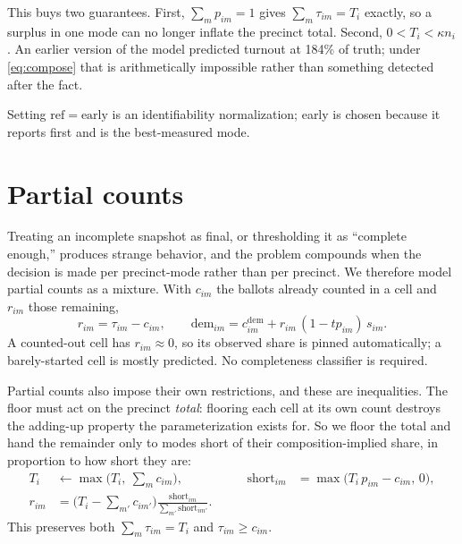 \documentclass[11pt]{article}
\newcommand{\dem}{\mathrm{dem}}
\newcommand{\refm}{\mathrm{ref}}
\begin{document}
This buys two guarantees. First, $\sum_m p_{im} = 1$ gives $\sum_m \tau_{im} = T_i$
exactly, so a surplus in one mode can no longer inflate the precinct total. Second,
$0 < T_i < \kappa n_i$. An earlier version of the model predicted turnout at 184\% of
truth; under \eqref{eq:compose} that is arithmetically impossible rather than something
detected after the fact.

Setting $\refm = \text{early}$ is an identifiability normalization; early is chosen
because it reports first and is the best-measured mode.

\section{Partial counts}

Treating an incomplete snapshot as final, or thresholding it as ``complete enough,''
produces strange behavior, and the problem compounds when the decision is made per
precinct-mode rather than per precinct. We therefore model partial counts as a mixture.
With $c_{im}$ the ballots already counted in a cell and $r_{im}$ those remaining,
\begin{equation}
  r_{im} = \tau_{im} - c_{im}, \qquad
  \dem_{im} = c^{\dem}_{im} + r_{im}\,(1 - tp_{im})\,s_{im}.
  \label{eq:mixture}
\end{equation}
A counted-out cell has $r_{im} \approx 0$, so its observed share is pinned automatically;
a barely-started cell is mostly predicted. No completeness classifier is required.

Partial counts also impose their own restrictions, and these are inequalities. The floor
must act on the precinct \emph{total}: flooring each cell at its own count destroys the
adding-up property the parameterization exists for. So we floor the total and hand the
remainder only to modes short of their composition-implied share, in proportion to how
short they are:
\begin{equation}
  \begin{aligned}
    T_i &\leftarrow \max\Big(T_i,\ \textstyle\sum_m c_{im}\Big),
    &\qquad
    \text{short}_{im} &= \max\big(T_i\, p_{im} - c_{im},\, 0\big), \\[4pt]
    r_{im} &= \Big(T_i - \textstyle\sum_{m'} c_{im'}\Big)
              \frac{\text{short}_{im}}{\sum_{m'} \text{short}_{im'}}.
  \end{aligned}
  \label{eq:alloc}
\end{equation}
This preserves both $\sum_m \tau_{im} = T_i$ and $\tau_{im} \geq c_{im}$.
\end{document}
